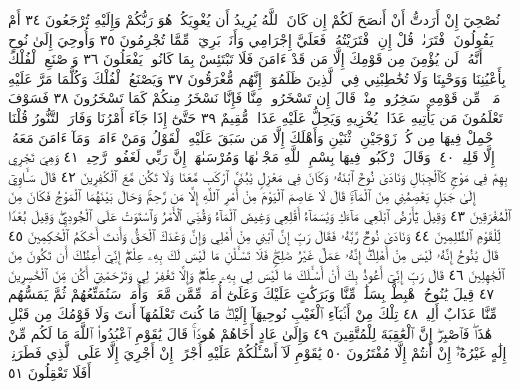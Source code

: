 نُصْحِيٓ إِنْ أَرَدتُّ أَنْ أَنصَحَ لَكُمْ إِن كَانَ ٱللَّهُ يُرِيدُ أَن
يُغْوِيَكُمْۚ هُوَ رَبُّكُمْ وَإِلَيْهِ تُرْجَعُونَ ٣٤ أَمْ يَقُولُونَ ٱفْتَرَىٰهُۖ
قُلْ إِنِ ٱفْتَرَيْتُهُۥ فَعَلَيَّ إِجْرَامِي وَأَنَا۠ بَرِيٓءࣱ مِّمَّا تُجْرِمُونَ ٣٥
وَأُوحِيَ إِلَىٰ نُوحٍ أَنَّهُۥ لَن يُؤْمِنَ مِن قَوْمِكَ إِلَّا مَن قَدْ ءَامَنَ
فَلَا تَبْتَئِسْ بِمَا كَانُوا۟ يَفْعَلُونَ ٣٦ وَٱصْنَعِ ٱلْفُلْكَ بِأَعْيُنِنَا
وَوَحْيِنَا وَلَا تُخَٰطِبْنِي فِي ٱلَّذِينَ ظَلَمُوٓا۟ إِنَّهُم مُّغْرَقُونَ ٣٧
وَيَصْنَعُ ٱلْفُلْكَ وَكُلَّمَا مَرَّ عَلَيْهِ مَلَأࣱ مِّن قَوْمِهِۦ سَخِرُوا۟ مِنْهُۚ
قَالَ إِن تَسْخَرُوا۟ مِنَّا فَإِنَّا نَسْخَرُ مِنكُمْ كَمَا تَسْخَرُونَ ٣٨
فَسَوْفَ تَعْلَمُونَ مَن يَأْتِيهِ عَذَابࣱ يُخْزِيهِ وَيَحِلُّ عَلَيْهِ عَذَابࣱ
مُّقِيمٌ ٣٩ حَتَّىٰٓ إِذَا جَآءَ أَمْرُنَا وَفَارَ ٱلتَّنُّورُ قُلْنَا ٱحْمِلْ فِيهَا
مِن كُلࣲّ زَوْجَيْنِ ٱثْنَيْنِ وَأَهْلَكَ إِلَّا مَن سَبَقَ عَلَيْهِ ٱلْقَوْلُ
وَمَنْ ءَامَنَۚ وَمَآ ءَامَنَ مَعَهُۥٓ إِلَّا قَلِيلࣱ ٤٠۞ وَقَالَ ٱرْكَبُوا۟ فِيهَا
بِسْمِ ٱللَّهِ مَجْرٜىٰهَا وَمُرْسَىٰهَآۚ إِنَّ رَبِّي لَغَفُورࣱ رَّحِيمࣱ ٤١
وَهِيَ تَجْرِي بِهِمْ فِي مَوْجࣲ كَٱلْجِبَالِ وَنَادَىٰ نُوحٌ ٱبْنَهُۥ
وَكَانَ فِي مَعْزِلࣲ يَٰبُنَيَّ ٱرْكَب مَّعَنَا وَلَا تَكُن مَّعَ ٱلْكَٰفِرِينَ ٤٢
قَالَ سَـَٔاوِيٓ إِلَىٰ جَبَلࣲ يَعْصِمُنِي مِنَ ٱلْمَآءِۚ قَالَ لَا عَاصِمَ ٱلْيَوْمَ
مِنْ أَمْرِ ٱللَّهِ إِلَّا مَن رَّحِمَۚ وَحَالَ بَيْنَهُمَا ٱلْمَوْجُ فَكَانَ مِنَ
ٱلْمُغْرَقِينَ ٤٣ وَقِيلَ يَٰٓأَرْضُ ٱبْلَعِي مَآءَكِ وَيَٰسَمَآءُ أَقْلِعِي
وَغِيضَ ٱلْمَآءُ وَقُضِيَ ٱلْأَمْرُ وَٱسْتَوَتْ عَلَى ٱلْجُودِيِّۖ وَقِيلَ
بُعْدࣰا لِّلْقَوْمِ ٱلظَّٰلِمِينَ ٤٤ وَنَادَىٰ نُوحࣱ رَّبَّهُۥ فَقَالَ رَبِّ إِنَّ ٱبْنِي
مِنْ أَهْلِي وَإِنَّ وَعْدَكَ ٱلْحَقُّ وَأَنتَ أَحْكَمُ ٱلْحَٰكِمِينَ ٤٥
قَالَ يَٰنُوحُ إِنَّهُۥ لَيْسَ مِنْ أَهْلِكَۖ إِنَّهُۥ عَمَلٌ غَيْرُ صَٰلِحࣲۖ فَلَا تَسْـَٔلْنِ
مَا لَيْسَ لَكَ بِهِۦ عِلْمٌۖ إِنِّيٓ أَعِظُكَ أَن تَكُونَ مِنَ ٱلْجَٰهِلِينَ ٤٦
قَالَ رَبِّ إِنِّيٓ أَعُوذُ بِكَ أَنْ أَسْـَٔلَكَ مَا لَيْسَ لِي بِهِۦ عِلْمࣱۖ وَإِلَّا
تَغْفِرْ لِي وَتَرْحَمْنِيٓ أَكُن مِّنَ ٱلْخَٰسِرِينَ ٤٧ قِيلَ يَٰنُوحُ
ٱهْبِطْ بِسَلَٰمࣲ مِّنَّا وَبَرَكَٰتٍ عَلَيْكَ وَعَلَىٰٓ أُمَمࣲ مِّمَّن مَّعَكَۚ
وَأُمَمࣱ سَنُمَتِّعُهُمْ ثُمَّ يَمَسُّهُم مِّنَّا عَذَابٌ أَلِيمࣱ ٤٨ تِلْكَ
مِنْ أَنۢبَآءِ ٱلْغَيْبِ نُوحِيهَآ إِلَيْكَۖ مَا كُنتَ تَعْلَمُهَآ أَنتَ
وَلَا قَوْمُكَ مِن قَبْلِ هَٰذَاۖ فَٱصْبِرْۖ إِنَّ ٱلْعَٰقِبَةَ لِلْمُتَّقِينَ ٤٩
وَإِلَىٰ عَادٍ أَخَاهُمْ هُودࣰاۚ قَالَ يَٰقَوْمِ ٱعْبُدُوا۟ ٱللَّهَ مَا لَكُم مِّنْ
إِلَٰهٍ غَيْرُهُۥٓۖ إِنْ أَنتُمْ إِلَّا مُفْتَرُونَ ٥٠ يَٰقَوْمِ لَآ أَسْـَٔلُكُمْ عَلَيْهِ
أَجْرًاۖ إِنْ أَجْرِيَ إِلَّا عَلَى ٱلَّذِي فَطَرَنِيٓۚ أَفَلَا تَعْقِلُونَ ٥١
